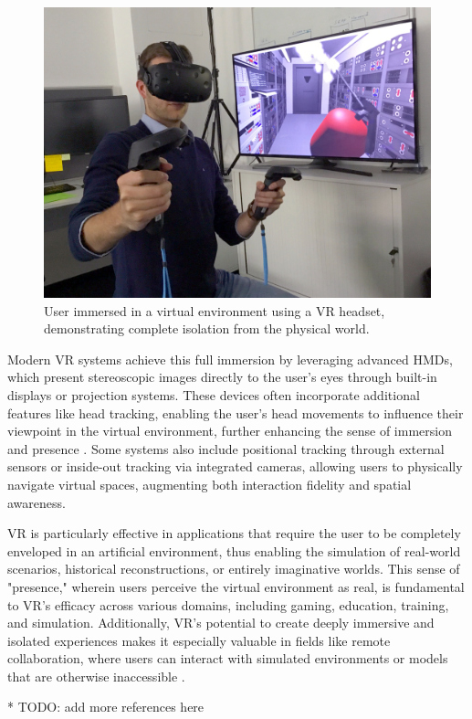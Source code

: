     \begin{figure}[h]
        \centering
        \includegraphics[width=0.6\linewidth]{figs/Reality_check_ESA384313.jpg}
        \caption{User immersed in a virtual environment using a VR headset, demonstrating complete isolation from the physical world.}
        \label{f:real-virtual-continuum}
    \end{figure}

    Modern \ac{VR} systems achieve this full immersion by leveraging advanced \ac{HMDs}, which present stereoscopic images directly to the user’s eyes through built-in displays or projection systems. These devices often incorporate additional features like head tracking, enabling the user’s head movements to influence their viewpoint in the virtual environment, further enhancing the sense of immersion and presence \cite{whatismixedreality}. Some systems also include positional tracking through external sensors or inside-out tracking via integrated cameras, allowing users to physically navigate virtual spaces, augmenting both interaction fidelity and spatial awareness.

    \ac{VR} is particularly effective in applications that require the user to be completely enveloped in an artificial environment, thus enabling the simulation of real-world scenarios, historical reconstructions, or entirely imaginative worlds. This sense of "presence," wherein users perceive the virtual environment as real, is fundamental to \ac{VR}'s efficacy across various domains, including gaming, education, training, and simulation. Additionally, \ac{VR}'s potential to create deeply immersive and isolated experiences makes it especially valuable in fields like remote collaboration, where users can interact with simulated environments or models that are otherwise inaccessible \cite{8712803}.

    * TODO: add more references here  



